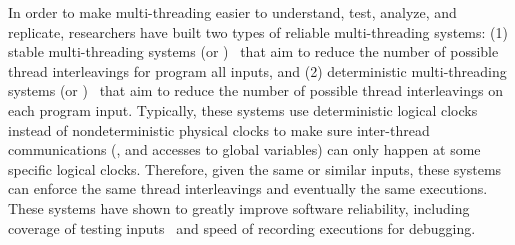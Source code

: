


 In order to make multi-threading easier to 
understand, test, analyze, and replicate, researchers have built two types of 
reliable multi-threading systems: (1) stable multi-threading systems (or 
\smt)~\cite{grace:oopsla09, dthreads:sosp11, determinator:osdi10} that aim to 
reduce the number of possible thread interleavings for program all inputs, and 
(2) deterministic multi-threading systems (or \dmt)~\cite{dpj:oopsla09, 
dmp:asplos09,kendo:asplos09,coredet:asplos10,dos:osdi10,ddos:asplos13,
ics:oopsla13} that aim to reduce the number of possible thread interleavings on 
each program input. Typically, these systems use deterministic logical clocks 
instead of nondeterministic physical clocks to make sure inter-thread 
communications (\eg, \mutexlock and accesses to global variables) can only 
happen at some specific logical clocks. Therefore, given the same or similar 
inputs, these systems can enforce the same thread interleavings and eventually 
the same executions. These systems 
have shown to greatly improve software reliability, including coverage of 
testing inputs~\cite{ics:oopsla13} and speed of recording 
executions\cite{dos:osdi10} for debugging.



